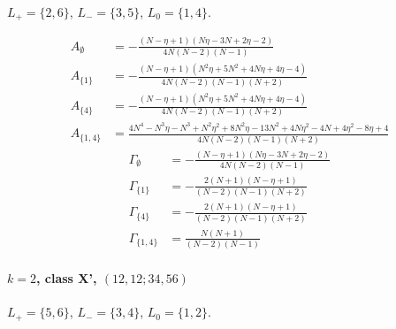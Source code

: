\documentclass[11pt]{article}
\begin{document}
$L_+=\{2,6\}$, $L_-=\{3,5\}$, $L_0=\{1,4\}$.

\begin{align*}
  A_{\emptyset} &= - \frac{\left(N - \eta + 1\right) \left(N \eta - 3 N + 2 \eta - 2\right)}{4 N \left(N - 2\right) \left(N - 1\right)} \\
  A_{\{1\}} &= - \frac{\left(N - \eta + 1\right) \left(N^{2} \eta + 5 N^{2} + 4 N \eta + 4 \eta - 4\right)}{4 N \left(N - 2\right) \left(N - 1\right) \left(N + 2\right)} \\
  A_{\{4\}} &= - \frac{\left(N - \eta + 1\right) \left(N^{2} \eta + 5 N^{2} + 4 N \eta + 4 \eta - 4\right)}{4 N \left(N - 2\right) \left(N - 1\right) \left(N + 2\right)} \\
  A_{\{1,4\}} &= \frac{4 N^{4} - N^{3} \eta - N^{3} + N^{2} \eta^{2} + 8 N^{2} \eta - 13 N^{2} + 4 N \eta^{2} - 4 N + 4 \eta^{2} - 8 \eta + 4}{4 N \left(N - 2\right) \left(N - 1\right) \left(N + 2\right)} 
\end{align*}
\begin{align*}
  \Gamma_{\emptyset} &= - \frac{\left(N - \eta + 1\right) \left(N \eta - 3 N + 2 \eta - 2\right)}{4 N \left(N - 2\right) \left(N - 1\right)} \\
  \Gamma_{\{1\}} &= - \frac{2 \left(N + 1\right) \left(N - \eta + 1\right)}{\left(N - 2\right) \left(N - 1\right) \left(N + 2\right)} \\
  \Gamma_{\{4\}} &= - \frac{2 \left(N + 1\right) \left(N - \eta + 1\right)}{\left(N - 2\right) \left(N - 1\right) \left(N + 2\right)} \\
  \Gamma_{\{1,4\}} &= \frac{N \left(N + 1\right)}{\left(N - 2\right) \left(N - 1\right)} 
\end{align*}

\paragraph{$k=2$, class X', $(12,12;34,56)$}

$L_+=\{5,6\}$, $L_-=\{3,4\}$, $L_0=\{1,2\}$.
\end{document}
